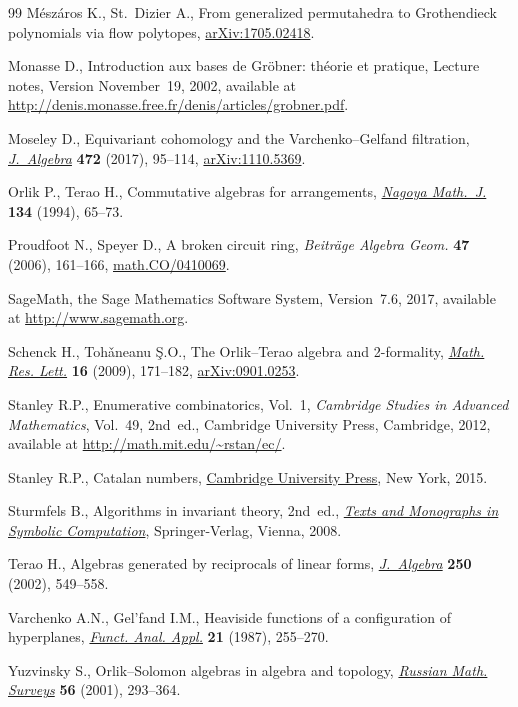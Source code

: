 \documentclass[pdftex]{sigma}
\numberwithin{equation}{section}
\begin{document}
\begin{thebibliography}{99}
M\'esz\'aros K., St.~Dizier A., From generalized permutahedra to {G}rothendieck
 polynomials via flow polytopes, \href{https://arxiv.org/abs/1705.02418}{arXiv:1705.02418}.

Monasse D., Introduction aux bases de {G}r\"{o}bner: th\'{e}orie et pratique,
 {L}ecture notes, {V}ersion November~19, 2002, available at
 \url{http://denis.monasse.free.fr/denis/articles/grobner.pdf}.

Moseley D., Equivariant cohomology and the {V}archenko--{G}elfand filtration,
 \href{https://doi.org/10.1016/j.jalgebra.2016.10.010}{\textit{J.~Algebra}} \textbf{472} (2017), 95--114, \href{https://arxiv.org/abs/1110.5369}{arXiv:1110.5369}.

Orlik P., Terao H., Commutative algebras for arrangements, \href{https://doi.org/10.1017/S0027763000004852}{\textit{Nagoya Math.~J.}} \textbf{134} (1994), 65--73.

Proudfoot N., Speyer D., A broken circuit ring, \textit{Beitr\"age Algebra
 Geom.} \textbf{47} (2006), 161--166, \href{https://arxiv.org/abs/math.CO/0410069}{math.CO/0410069}.

SageMath, the Sage Mathematics Software System, {V}ersion~7.6, 2017, available
 at \url{http://www.sagemath.org}.

Schenck H., Toh\v{a}neanu \c{S}.O., The {O}rlik--{T}erao algebra and 2-formality,
 \href{https://doi.org/10.4310/MRL.2009.v16.n1.a17}{\textit{Math. Res. Lett.}} \textbf{16} (2009), 171--182, \href{https://arxiv.org/abs/0901.0253}{arXiv:0901.0253}.

Stanley R.P., Enumerative combinatorics, {V}ol.~1, \textit{Cambridge Studies in
 Advanced Mathematics}, Vol.~49, 2nd~ed., Cambridge University Press,
 Cambridge, 2012, available at \url{http://math.mit.edu/~rstan/ec/}.

Stanley R.P., Catalan numbers, \href{https://doi.org/10.1017/CBO9781139871495}{Cambridge University Press}, New York, 2015.

Sturmfels B., Algorithms in invariant theory, 2nd~ed., \href{https://doi.org/10.1007/978-3-211-77417-5}{\textit{Texts and Monographs in
 Symbolic Computation}}, Springer-Verlag, Vienna, 2008.

Terao H., Algebras generated by reciprocals of linear forms,
 \href{https://doi.org/10.1006/jabr.2001.9121}{\textit{J.~Algebra}} \textbf{250} (2002), 549--558.

Varchenko A.N., Gel'fand I.M., Heaviside functions of a configuration of
 hyperplanes, \href{https://doi.org/10.1007/BF01077800}{\textit{Funct. Anal. Appl.}} \textbf{21} (1987), 255--270.

Yuzvinsky S., Orlik--{S}olomon algebras in algebra and topology,
 \href{https://doi.org/10.1070/RM2001v056n02ABEH000383}{\textit{Russian Math. Surveys}} \textbf{56} (2001), 293--364.

\end{thebibliography}\LastPageEnding
\end{document}
